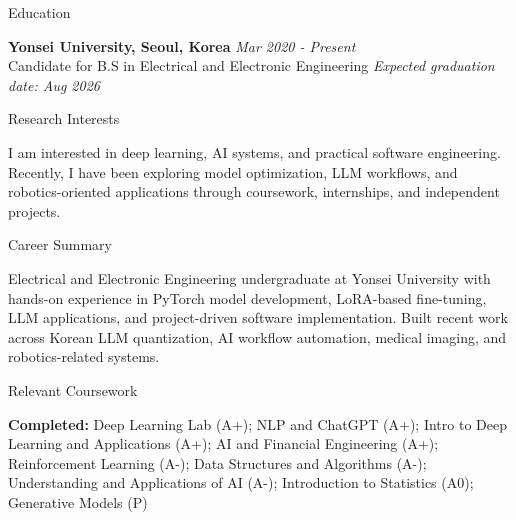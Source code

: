 \documentclass{resume} %
\begin{document}

\begin{rSection}{Education}

{\bf Yonsei University, Seoul, Korea } \hfill {\em Mar 2020 - Present} 
\\Candidate for B.S in  Electrical and Electronic Engineering \hfill {\em Expected graduation date: Aug 2026}

\end{rSection}

\begin{rSection}{Research Interests}

I am interested in deep learning, AI systems, and practical software engineering. Recently, I have been exploring model optimization, LLM workflows, and robotics-oriented applications through coursework, internships, and independent projects.

\end{rSection}

\begin{rSection}{Career Summary}

Electrical and Electronic Engineering undergraduate at Yonsei University with hands-on experience in PyTorch model development, LoRA-based fine-tuning, LLM applications, and project-driven software implementation. Built recent work across Korean LLM quantization, AI workflow automation, medical imaging, and robotics-related systems.

\end{rSection}

\begin{rSection}{Relevant Coursework}

\textbf{Completed:}
Deep Learning Lab (A+);
NLP and ChatGPT (A+);
Intro to Deep Learning and Applications (A+);
AI and Financial Engineering (A+);
Reinforcement Learning (A-);
Data Structures and Algorithms (A-);
Understanding and Applications of AI (A-);
Introduction to Statistics (A0);
Generative Models (P)

\end{rSection}

\end{document}
